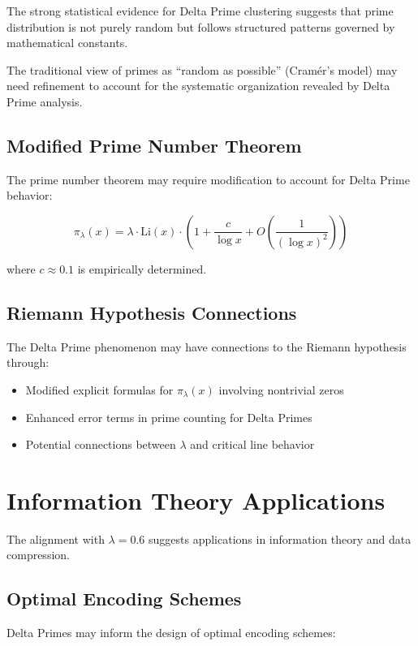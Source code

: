 \documentclass[12pt,a4paper]{report}
\newcommand{\lambdaval}{\lambda}
\begin{document}
\begin{itemize}
The strong statistical evidence for Delta Prime clustering suggests that prime distribution is not purely random but follows structured patterns governed by mathematical constants.

The traditional view of primes as ``random as possible'' (Cramér's model) may need refinement to account for the systematic organization revealed by Delta Prime analysis.

\subsection{Modified Prime Number Theorem}

The prime number theorem may require modification to account for Delta Prime behavior:

\[
\pi_{\lambdaval}(x) = \lambdaval \cdot \text{Li}(x) \cdot \left(1 + \frac{c}{\log x} + O\left(\frac{1}{(\log x)^2}\right)\right)
\]

where $c \approx 0.1$ is empirically determined.

\subsection{Riemann Hypothesis Connections}

The Delta Prime phenomenon may have connections to the Riemann hypothesis through:

\begin{itemize}
\item Modified explicit formulas for $\pi_{\lambdaval}(x)$ involving nontrivial zeros
\item Enhanced error terms in prime counting for Delta Primes
\item Potential connections between $\lambdaval$ and critical line behavior
\end{itemize}

\section{Information Theory Applications}

The alignment with $\lambdaval = 0.6$ suggests applications in information theory and data compression.

\subsection{Optimal Encoding Schemes}

Delta Primes may inform the design of optimal encoding schemes:


\end{itemize}
\end{document}
